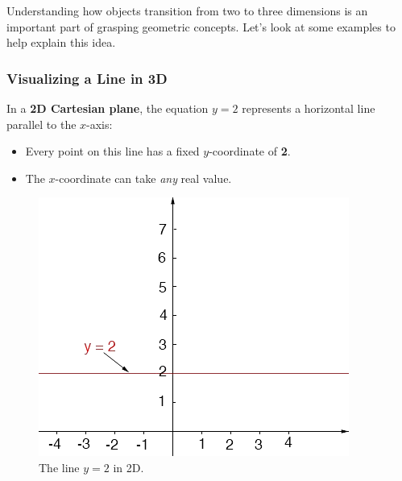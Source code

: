 \documentclass{article}
\begin{document}
Understanding how objects transition from two to three dimensions is an important part of grasping geometric concepts. Let’s look at some examples to help explain this idea.

\subsubsection*{Visualizing a Line in 3D}

\begin{examplebox}
In a \textbf{2D Cartesian plane}, the equation \( y = 2 \) represents a horizontal line parallel to the \( x \)-axis:

\begin{minipage}{0.55\textwidth}
    \vspace{1em}
    \begin{itemize}
        \item Every point on this line has a fixed \( y \)-coordinate of \textbf{2}.
        \item The \( x \)-coordinate can take \textit{any} real value.
    \end{itemize}
    \vspace{1em}
\end{minipage}
\begin{minipage}{0.3\textwidth}
    \begin{figure}[H]
        \centering
        \includegraphics[width=\textwidth]{y = 2.png}
        \caption{The line \( y = 2 \) in 2D.}
        \label{fig:line_2d}
    \end{figure}
\end{minipage}


\end{examplebox}
\end{document}
